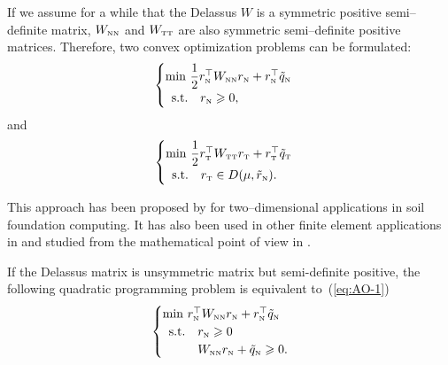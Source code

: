 {If we assume for a while that the Delassus $W$ is a symmetric positive semi--definite  matrix, $W_{{\hbox{\tiny{N}}}{\hbox{\tiny{N}}}}$ and $W_{{\hbox{\tiny{T}}}{\hbox{\tiny{T}}}}$ are also symmetric semi--definite positive matrices.
Therefore, two convex optimization problems can be formulated:
 \begin{equation}
  \label{eq:AO-3}
  \begin{cases}
    \min\, \Frac 1 2 r_\n^\top  W_{\n\n} r_\n + r_\n^\top \tilde q_\n \\
    \begin{array}{ll}
    \text{s.t.} & r_\n \geq 0,
  \end{array}\end{cases}
\end{equation}
and
\begin{equation}
  \label{eq:AO-4}
  \begin{cases}
    \min\, \Frac 1 2  r_\t^\top W _{\t\t} r_\t +  r_\t^\top \tilde q_\t \\
    \begin{array}{ll}
     \text{s.t.}  & r_\t \in D(\mu,\tilde r_{\n}).
  \end{array}
\end{cases}
\end{equation}


This approach has been proposed by \cite{Panagiotopoulos_IA1975} for two--dimensional applications in soil foundation computing. It has also been used  in other finite element applications  in \citep{Barbosa.Feijoo_CISM1985,Tzaferopoulos_CS1993} and studied from the mathematical point of view in \cite{Haslinger.Panagiotopoulos_PRSE1984,Haslinger.ea1996}.

\begin{remark}
  If the Delassus matrix is unsymmetric matrix but semi-definite positive, the following  quadratic programming problem is equivalent to~(\ref{eq:AO-1})
  \begin{equation}
  \label{eq:AO-5}
  \begin{cases}
    \min\,  r_\n^\top  W_{\n\n} r_\n + r_\n^\top \tilde q_\n \\
    \begin{array}{ll}
      \text{s.t.} & r_\n \geq 0\\
      & W_{\n\n} r_\n + \tilde  q_\n \geq 0.
    \end{array}
  \end{cases}
\end{equation}
\end{remark}



}
